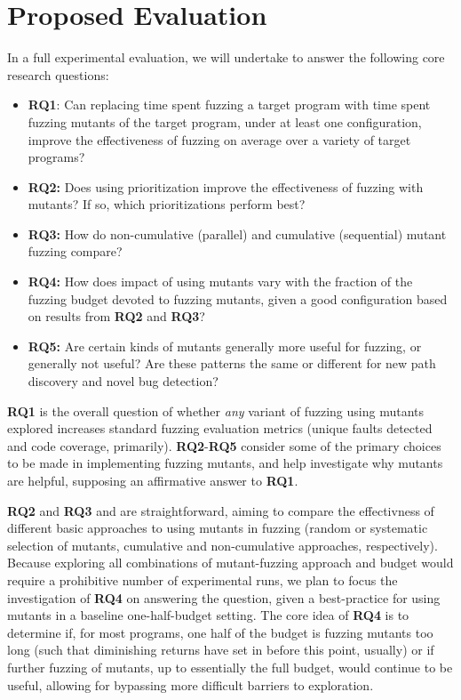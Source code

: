 \section{Proposed Evaluation}

In a full experimental evaluation, we will undertake to answer the following core research questions:

\begin{itemize}
  \item {\bf RQ1}: Can replacing time spent fuzzing a target program with time spent fuzzing mutants of the target program, under at least one configuration, improve
  the effectiveness of fuzzing on average over a variety of target programs?
  \item {\bf RQ2:} Does using prioritization improve the effectiveness of fuzzing with mutants?  If so, which prioritizations perform best?
  \item {\bf RQ3:} How do non-cumulative (parallel) and cumulative (sequential) mutant fuzzing compare?
  \item {\bf RQ4:} How does impact of using mutants vary with the fraction of the fuzzing budget devoted to fuzzing mutants, given a good configuration based on results from {\bf RQ2} and {\bf RQ3}?
  \item {\bf RQ5:} Are certain kinds of mutants generally more useful for fuzzing, or generally not useful?  Are these patterns the same or different for new path discovery and novel bug detection?
  \end{itemize}
  
{\bf RQ1} is the overall question of whether \emph{any} variant of fuzzing using mutants explored increases standard fuzzing evaluation metrics
(unique faults detected and code coverage, primarily).  {\bf RQ2}-{\bf RQ5} consider some of the primary choices to be made in implementing fuzzing mutants, and help investigate why mutants are helpful, supposing an affirmative answer to {\bf RQ1}.

{\bf RQ2} and {\bf RQ3} and are straightforward, aiming to compare the effectivness of different basic approaches to using mutants in fuzzing (random or systematic selection of mutants, cumulative and non-cumulative approaches, respectively).  Because exploring all combinations of mutant-fuzzing approach and budget would require a prohibitive number of experimental runs, we plan to focus the investigation of {\bf RQ4} on answering the question, given a best-practice for using mutants in a baseline one-half-budget setting.  The core idea of {\bf RQ4} is to determine if, for most programs, one half of the budget is fuzzing mutants too long (such that diminishing returns have set in before this point, usually) or if further fuzzing of mutants, up to essentially the full budget, would continue to be useful, allowing for bypassing more difficult barriers to exploration.

